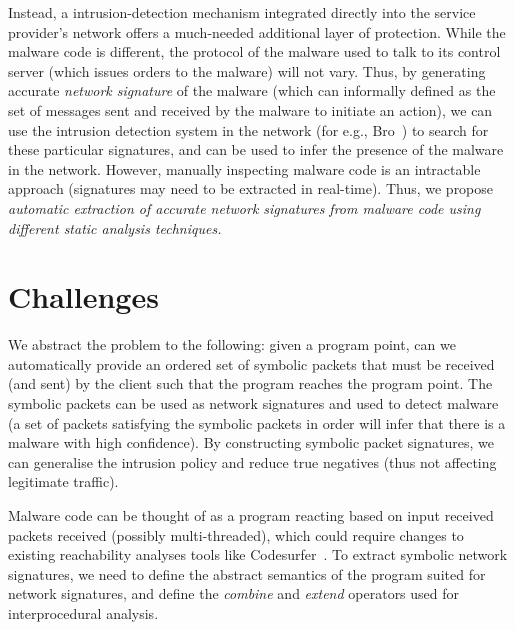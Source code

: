 \documentclass[twocolumn, 11pt]{paper}
\begin{document}
Instead, a intrusion-detection mechanism integrated 
directly into the service provider’s network offers a
much-needed additional layer of protection. While the malware
code is different, the protocol of the malware used to talk to its
control server (which issues orders to the malware) will not vary. 
Thus, by generating accurate \emph{network signature} of the malware (which
can informally defined as the set of messages sent and received by the malware to
initiate an action), we can use the intrusion detection system in the
network (for e.g., Bro~\cite{bro}) to search for these particular signatures,
and can be used to infer the presence of the malware in the network. However,
manually inspecting malware code is an intractable approach (signatures may 
need to be extracted in real-time). Thus, we propose \emph{automatic extraction 
of accurate network signatures from malware code using different static
analysis techniques.} 

\section{Challenges}
We abstract the problem to the following: given a program point,
can we automatically provide an ordered set of symbolic packets 
that must be received (and sent) by the client such that the program 
reaches the program point. The symbolic packets can be used as
network signatures and used to detect malware (a set of packets
satisfying the symbolic packets in order will infer that there 
is a malware with high confidence). By constructing symbolic packet
signatures, we can generalise the intrusion policy and reduce 
true negatives (thus not affecting legitimate traffic).

Malware code can be thought of as a program reacting based on input received
packets received (possibly multi-threaded), which
could require changes to existing reachability analyses tools 
like Codesurfer~\cite{codesurfer}. To extract symbolic network
signatures, we need to define the abstract semantics of the program
suited for network signatures, and define the \emph{combine} and 
\emph{extend} operators used for interprocedural analysis.
\end{document}
